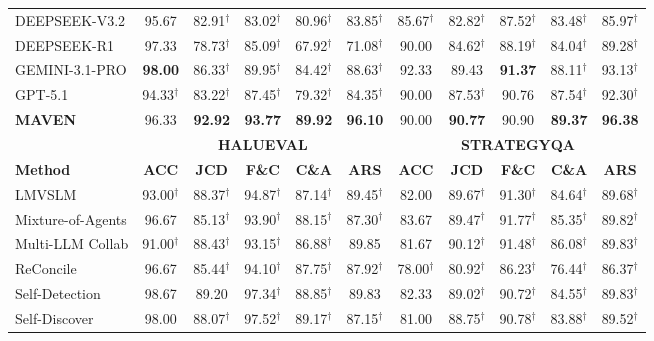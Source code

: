 \documentclass{article}
\begin{document}
\begin{table}[t]
\begin{tabular}{l ccccc ccccc}
\midrule
DEEPSEEK-V3.2 & 95.67 & 82.91$^\dagger$ & 83.02$^\dagger$ & 80.96$^\dagger$ & 83.85$^\dagger$ & 85.67$^\dagger$ & 82.82$^\dagger$ & 87.52$^\dagger$ & 83.48$^\dagger$ & 85.97$^\dagger$ \\
DEEPSEEK-R1 & 97.33 & 78.73$^\dagger$ & 85.09$^\dagger$ & 67.92$^\dagger$ & 71.08$^\dagger$ & 90.00 & 84.62$^\dagger$ & 88.19$^\dagger$ & 84.04$^\dagger$ & 89.28$^\dagger$ \\
GEMINI-3.1-PRO & \textbf{98.00} & 86.33$^\dagger$ & 89.95$^\dagger$ & 84.42$^\dagger$ & 88.63$^\dagger$ & 92.33 & 89.43 & \textbf{91.37} & 88.11$^\dagger$ & 93.13$^\dagger$ \\
GPT-5.1 & 94.33$^\dagger$ & 83.22$^\dagger$ & 87.45$^\dagger$ & 79.32$^\dagger$ & 84.35$^\dagger$ & 90.00 & 87.53$^\dagger$ & 90.76 & 87.54$^\dagger$ & 92.30$^\dagger$ \\

\midrule
\textbf{MAVEN} & 96.33 & \textbf{92.92} & \textbf{93.77} & \textbf{89.92} & \textbf{96.10} & 90.00 & \textbf{90.77} & 90.90 & \textbf{89.37} & \textbf{96.38} \\

\midrule \midrule
& \multicolumn{5}{c}{\textbf{HALUEVAL}} & \multicolumn{5}{c}{\textbf{STRATEGYQA}} \\
\cmidrule(lr){2-6} \cmidrule(lr){7-11}
\textbf{Method} & \textbf{ACC} & \textbf{JCD} & \textbf{F\&C} & \textbf{C\&A} & \textbf{ARS} & \textbf{ACC} & \textbf{JCD} & \textbf{F\&C} & \textbf{C\&A} & \textbf{ARS} \\
\midrule
LMVSLM & 93.00$^\dagger$ & 88.37$^\dagger$ & 94.87$^\dagger$ & 87.14$^\dagger$ & 89.45$^\dagger$ & 82.00 & 89.67$^\dagger$ & 91.30$^\dagger$ & 84.64$^\dagger$ & 89.68$^\dagger$ \\
Mixture-of-Agents & 96.67 & 85.13$^\dagger$ & 93.90$^\dagger$ & 88.15$^\dagger$ & 87.30$^\dagger$ & 83.67 & 89.47$^\dagger$ & 91.77$^\dagger$ & 85.35$^\dagger$ & 89.82$^\dagger$ \\
Multi-LLM Collab & 91.00$^\dagger$ & 88.43$^\dagger$ & 93.15$^\dagger$ & 86.88$^\dagger$ & 89.85 & 81.67 & 90.12$^\dagger$ & 91.48$^\dagger$ & 86.08$^\dagger$ & 89.83$^\dagger$ \\
ReConcile & 96.67 & 85.44$^\dagger$ & 94.10$^\dagger$ & 87.75$^\dagger$ & 87.92$^\dagger$ & 78.00$^\dagger$ & 80.92$^\dagger$ & 86.23$^\dagger$ & 76.44$^\dagger$ & 86.37$^\dagger$ \\
Self-Detection & 98.67 & 89.20 & 97.34$^\dagger$ & 88.85$^\dagger$ & 89.83 & 82.33 & 89.02$^\dagger$ & 90.72$^\dagger$ & 84.55$^\dagger$ & 89.83$^\dagger$ \\
Self-Discover & 98.00 & 88.07$^\dagger$ & 97.52$^\dagger$ & 89.17$^\dagger$ & 87.15$^\dagger$ & 81.00 & 88.75$^\dagger$ & 90.78$^\dagger$ & 83.88$^\dagger$ & 89.52$^\dagger$ \\


\end{tabular}
\end{table}
\end{document}
